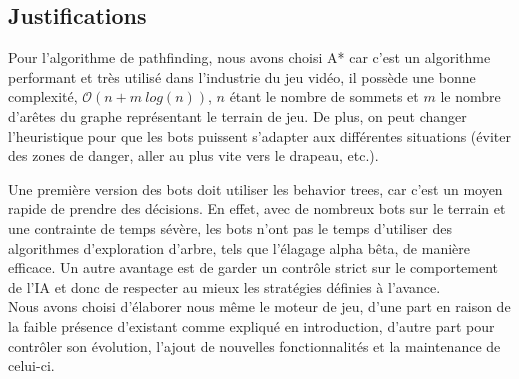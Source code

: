     
\subsection{Justifications}

Pour l'algorithme de pathfinding, nous avons choisi A* car c'est un algorithme performant et très utilisé dans l'industrie du jeu vidéo, il possède une bonne complexité, $\mathcal{O}(n + m\ log(n))$, $n$ étant le nombre de sommets et $m$ le nombre d'arêtes du graphe représentant le terrain de jeu. De plus, on peut changer l'heuristique pour que les bots puissent s'adapter aux différentes situations (éviter des zones de danger, aller au plus vite vers le drapeau, etc.). \newline

Une première version des bots doit utiliser les behavior trees, car c'est un moyen rapide de prendre des décisions. En effet, avec de nombreux bots sur le terrain et une contrainte de temps sévère, les bots n'ont pas le temps d'utiliser des algorithmes d'exploration d'arbre, tels que l'élagage alpha bêta, de manière efficace. Un autre avantage est de garder un contrôle strict sur le comportement de l'IA et donc de respecter au mieux les stratégies définies à l'avance.\\

Nous avons choisi d'élaborer nous même le moteur de jeu, d'une part en raison de la faible présence d'existant comme expliqué en introduction, d'autre part pour contrôler son évolution, l'ajout de nouvelles fonctionnalités et la maintenance de celui-ci.
